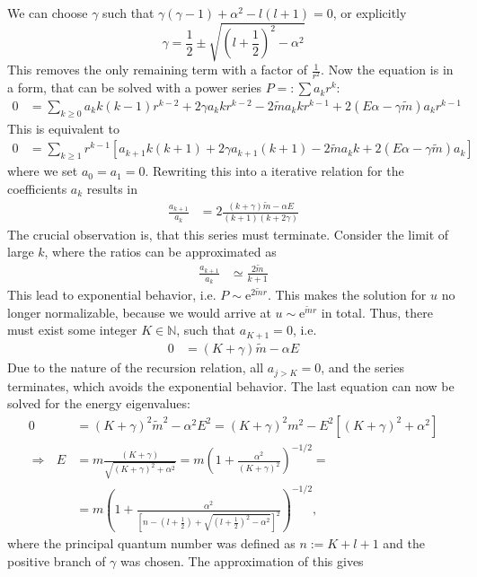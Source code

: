 \documentclass[english, parskip=full]{scrartcl}
\newcommand{\kla}{}
\newcommand{\klam}{}
\def\E{\text{e}}
\begin{document}
We can choose $\gamma$ such that $\gamma(\gamma-1)+\alpha^2-l(l+1)=0$, or explicitly
$$\gamma=\frac{1}{2}\pm\sqrt{\kla\left( {l+\frac{1}{2}} \right)^2-\alpha^2}$$
This removes the only remaining term with a factor of $\frac{1}{r^2}$. Now the equation is in a form, that can be solved with a power series $P=:\sum a_k r^k$:
\begin{align*}
0&=\sum_{k\ge 0}a_kk(k-1)r^{k-2}+2\gamma a_kkr^{k-2}-2\tilde{m}a_kkr^{k-1}+2(E\alpha-\gamma\tilde{m})a_kr^{k-1}
\end{align*}
This is equivalent to 
\begin{align*}
0&=\sum_{k\ge 1}r^{k-1}\klam\left[ a_{k+1}k(k+1)+2\gamma a_{k+1}(k+1)-2\tilde{m}a_kk +2(E\alpha-\gamma\tilde{m})a_k \right]
\end{align*}
where we set $a_0=a_1=0$. Rewriting this into a iterative relation for the coefficients $a_k$ results in
\begin{align*}
\frac{a_{k+1}}{a_k}&=2\frac{(k+\gamma)\tilde{m}-\alpha E}{(k+1)(k+2\gamma)}
\end{align*}
The crucial observation is, that this series must terminate. Consider the limit of large $k$, where the ratios can be approximated as
\begin{align*}
\frac{a_{k+1}}{a_k}&\simeq \frac{2\tilde{m}}{k+1}
\end{align*}
This lead to exponential behavior, i.e. $P\sim \E^{2\tilde{m}r}$. This makes the solution for $u$ no longer normalizable, because we would arrive at $u\sim \E^{\tilde{m}r}$ in total. Thus, there must exist some integer $K\in\mathbb{N}$, such that $a_{K+1}=0$, i.e.
\begin{align*}
0&=(K+\gamma)\tilde{m}-\alpha E
\end{align*}
Due to the nature of the recursion relation, all $a_{j>K}=0$, and the series terminates, which avoids the exponential behavior. The last equation can now be solved for the energy eigenvalues:
\begin{align*}
0&=(K+\gamma)^2\tilde{m}^2-\alpha^2E^2=(K+\gamma)^2m^2-E^2\klam\left[ {(K+\gamma)^2+\alpha^2} \right]\\
\Rightarrow\ \ \ E&=m\frac{(K+\gamma)}{\sqrt{(K+\gamma)^2+\alpha^2}}=m\kla\left( {1+\frac{\alpha^2}{(K+\gamma)^2}} \right)^{-1/2}=\\
&=m\kla\left( {1+\frac{\alpha^2}{\klam\left[ n-\kla\left( {l+\frac{1}{2}} \right)+\sqrt{\kla\left( {l+\frac{1}{2}} \right)^2-\alpha^2} \right]^2}} \right)^{-1/2},
\end{align*}
where the principal quantum number was defined as $n:=K+l+1$ and the positive branch of $\gamma$ was chosen. The approximation of this gives
\end{document}
